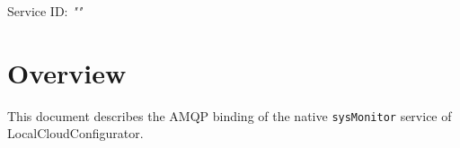 \documentclass[a4paper]{arrowhead}
\begin{document}
\sloppy

\ArrowheadSetup

\begin{center}
  \vspace*{1cm}
  \huge{\arrowtitle}

  \vspace*{0.2cm}
  \LARGE{\arrowtype}
  \vspace*{1cm}

  \Large{Service ID: \textit{"\arrowid"}}

  \vspace*{\fill}


  \vspace*{1cm}
  \vspace*{\fill}

  \begin{abstract}
    This document describes the AMQP 0-9-1 protocol with TLS payload security and JSON payload encoding variant of the \texttt{sysMonitor} service of the LocalCloudConfigurator system (SysMonitor-AMQP-IDD-5.2.2).
  \end{abstract}

  \vspace*{1cm}
\end{center}

\newpage

\tableofcontents
\newpage

\section{Overview}
\label{sec:overview}

This document describes the AMQP binding of the native \texttt{sysMonitor} service of LocalCloudConfigurator.
\end{document}
